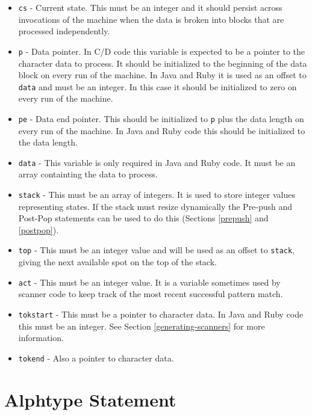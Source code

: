 \documentclass[letterpaper,11pt,oneside]{book}
\begin{document}
\begin{itemize}

\item \verb|cs| - Current state. This must be an integer and it should persist
across invocations of the machine when the data is broken into blocks that are
processed independently.

\item \verb|p| - Data pointer. In C/D code this variable is expected to be a
pointer to the character data to process. It should be initialized to the
beginning of the data block on every run of the machine. In Java and Ruby it is
used as an offset to \verb|data| and must be an integer. In this case it should
be initialized to zero on every run of the machine.

\item \verb|pe| - Data end pointer. This should be initialized to \verb|p| plus
the data length on every run of the machine. In Java and Ruby code this should
be initialized to the data length.

\item \verb|data| - This variable is only required in Java and Ruby code. It
must be an array containting the data to process.

\item \verb|stack| - This must be an array of integers. It is used to store
integer values representing states. If the stack must resize dynamically the
Pre-push and Post-Pop statements can be used to do this (Sections
\ref{prepush} and \ref{postpop}).

\item \verb|top| - This must be an integer value and will be used as an offset
to \verb|stack|, giving the next available spot on the top of the stack.

\item \verb|act| - This must be an integer value. It is a variable sometimes
used by scanner code to keep track of the most recent successful pattern match.

\item \verb|tokstart| - This must be a pointer to character data. In Java and
Ruby code this must be an integer. See Section \ref{generating-scanners} for
more information.

\item \verb|tokend| - Also a pointer to character data.

\end{itemize}

\section{Alphtype Statement}
\end{document}
